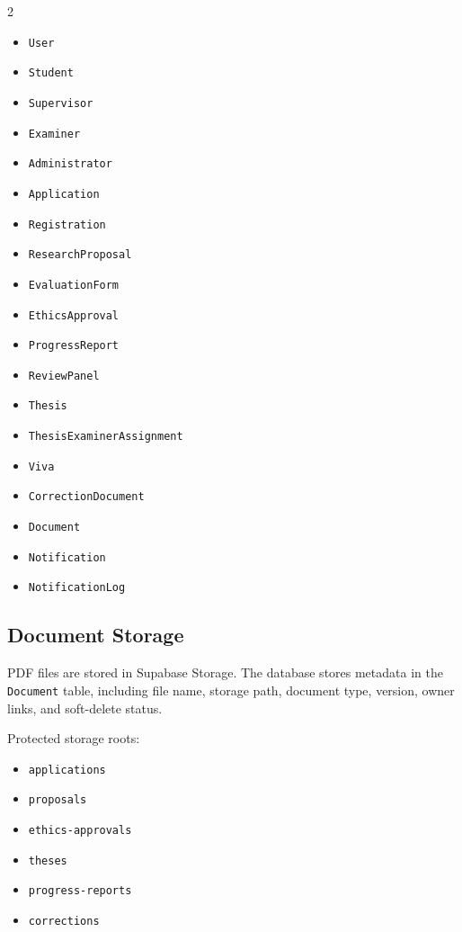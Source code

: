 \documentclass[11pt,a4paper]{article}
\newcommand{\code}[1]{\texttt{#1}}
\begin{document}
\begin{multicols}{2}
\begin{itemize}
  \item \code{User}
  \item \code{Student}
  \item \code{Supervisor}
  \item \code{Examiner}
  \item \code{Administrator}
  \item \code{Application}
  \item \code{Registration}
  \item \code{ResearchProposal}
  \item \code{EvaluationForm}
  \item \code{EthicsApproval}
  \item \code{ProgressReport}
  \item \code{ReviewPanel}
  \item \code{Thesis}
  \item \code{ThesisExaminerAssignment}
  \item \code{Viva}
  \item \code{CorrectionDocument}
  \item \code{Document}
  \item \code{Notification}
  \item \code{NotificationLog}
\end{itemize}
\end{multicols}

\subsection{Document Storage}

PDF files are stored in Supabase Storage. The database stores metadata in the \code{Document} table, including file name, storage path, document type, version, owner links, and soft-delete status.

Protected storage roots:

\begin{itemize}
  \item \code{applications}
  \item \code{proposals}
  \item \code{ethics-approvals}
  \item \code{theses}
  \item \code{progress-reports}
  \item \code{corrections}
\end{itemize}
\end{document}
